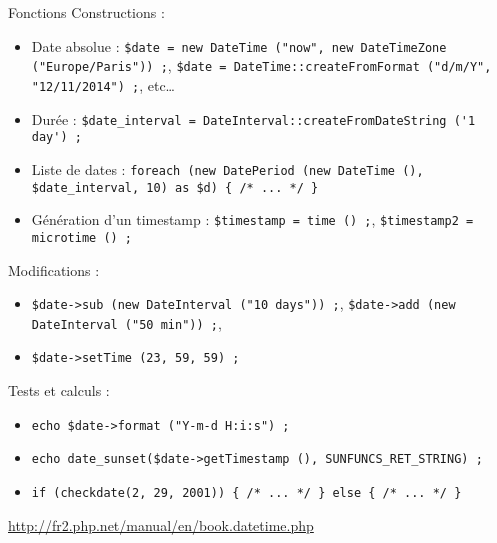 \begin{frame}[containsverbatim]{Fonctions}
	Constructions :
	\begin{itemize}
		\item Date absolue : \lstinline§$date = new DateTime ("now", new DateTimeZone ("Europe/Paris")) ;§, \lstinline§$date = DateTime::createFromFormat ("d/m/Y", "12/11/2014") ;§, etc\ldots
		\item Durée : \lstinline§$date_interval = DateInterval::createFromDateString ('1 day') ;§
		\item Liste de dates : \lstinline§foreach (new DatePeriod (new DateTime (), $date_interval, 10) as $d) { /* ... */ }§
		\item Génération d’un timestamp : \lstinline§$timestamp = time () ;§, \lstinline§$timestamp2 = microtime () ;§
	\end{itemize}
	Modifications :
	\begin{itemize}
		\item \lstinline§$date->sub (new DateInterval ("10 days")) ;§, \lstinline§$date->add (new DateInterval ("50 min")) ;§, 
		\item \lstinline§$date->setTime (23, 59, 59) ;§
	\end{itemize}
	Tests et calculs :
	\begin{itemize}
		\item \lstinline§echo $date->format ("Y-m-d H:i:s") ;§
		\item \lstinline§echo date_sunset($date->getTimestamp (), SUNFUNCS_RET_STRING) ;§
		\item \lstinline§if (checkdate(2, 29, 2001)) { /* ... */ } else { /* ... */ }§
	\end{itemize}
	\url{http://fr2.php.net/manual/en/book.datetime.php}
\end{frame}
